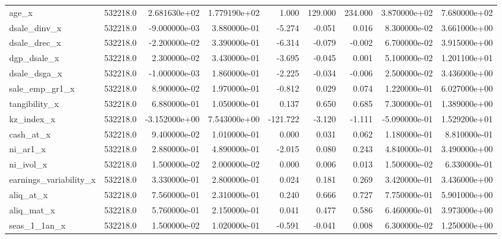 \documentclass[12pt]{article}
\begin{document}
\begin{landscape}
\begin{longtable}{|l|r|r|r|r|r|r|r|r|}
		age\_x                   & 532218.0 & 2.681630e+02  & 1.779190e+02 & 1.000      & 129.000     & 234.000     & 3.870000e+02  & 7.680000e+02 \\
		dsale\_dinv\_x           & 532218.0 & -9.000000e-03 & 3.880000e-01 & -5.274     & -0.051      & 0.016       & 8.300000e-02  & 3.661000e+00 \\
		dsale\_drec\_x           & 532218.0 & -2.200000e-02 & 3.390000e-01 & -6.314     & -0.079      & -0.002      & 6.700000e-02  & 3.915000e+00 \\
		dgp\_dsale\_x            & 532218.0 & 2.300000e-02  & 3.430000e-01 & -3.695     & -0.045      & 0.001       & 5.100000e-02  & 1.201100e+01 \\
		dsale\_dsga\_x           & 532218.0 & -1.000000e-03 & 1.860000e-01 & -2.225     & -0.034      & -0.006      & 2.500000e-02  & 3.436000e+00 \\
		sale\_emp\_gr1\_x        & 532218.0 & 8.900000e-02  & 1.970000e-01 & -0.812     & 0.029       & 0.074       & 1.220000e-01  & 6.027000e+00 \\
		tangibility\_x           & 532218.0 & 6.880000e-01  & 1.050000e-01 & 0.137      & 0.650       & 0.685       & 7.300000e-01  & 1.389000e+00 \\
		kz\_index\_x             & 532218.0 & -3.152000e+00 & 7.543000e+00 & -121.722   & -3.120      & -1.111      & -5.090000e-01 & 1.529200e+01 \\
		cash\_at\_x              & 532218.0 & 9.400000e-02  & 1.010000e-01 & 0.000      & 0.031       & 0.062       & 1.180000e-01  & 8.810000e-01 \\
		ni\_ar1\_x               & 532218.0 & 2.880000e-01  & 4.890000e-01 & -2.015     & 0.080       & 0.243       & 4.840000e-01  & 3.490000e+00 \\
		ni\_ivol\_x              & 532218.0 & 1.500000e-02  & 2.000000e-02 & 0.000      & 0.006       & 0.013       & 1.500000e-02  & 6.330000e-01 \\
		earnings\_variability\_x & 532218.0 & 3.330000e-01  & 2.800000e-01 & 0.024      & 0.181       & 0.269       & 3.420000e-01  & 3.436000e+00 \\
		aliq\_at\_x              & 532218.0 & 7.560000e-01  & 2.310000e-01 & 0.240      & 0.666       & 0.727       & 7.750000e-01  & 5.901000e+00 \\
		aliq\_mat\_x             & 532218.0 & 5.760000e-01  & 2.150000e-01 & 0.041      & 0.477       & 0.586       & 6.460000e-01  & 3.973000e+00 \\
		seas\_1\_1an\_x          & 532218.0 & 1.500000e-02  & 1.020000e-01 & -0.591     & -0.041      & 0.008       & 6.300000e-02  & 1.250000e+00 \\

\end{longtable}
\end{landscape}
\end{document}
